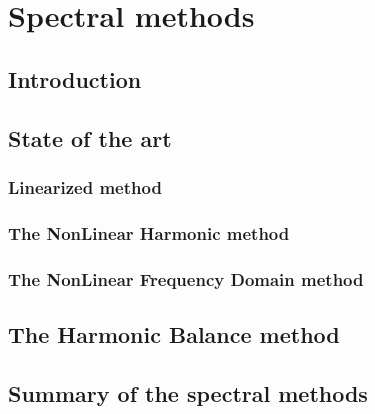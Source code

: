 \chapter{Spectral methods}
\label{cha:spectral_methods}

\section{Introduction}
\label{sec:sm_introduction}


\section{State of the art}
\label{sec:sm_state_of_the_art}


\subsection{Linearized method}
\label{sub:sm_lur}


\subsection{The NonLinear Harmonic method}
\label{sub:sm_nlh}


\subsection{The NonLinear Frequency Domain method}
\label{sub:sm_nlfd}


\section{The Harmonic Balance method}
\label{sec:sm_hb}


\section{Summary of the spectral methods}
\label{sec:sm_summary}

